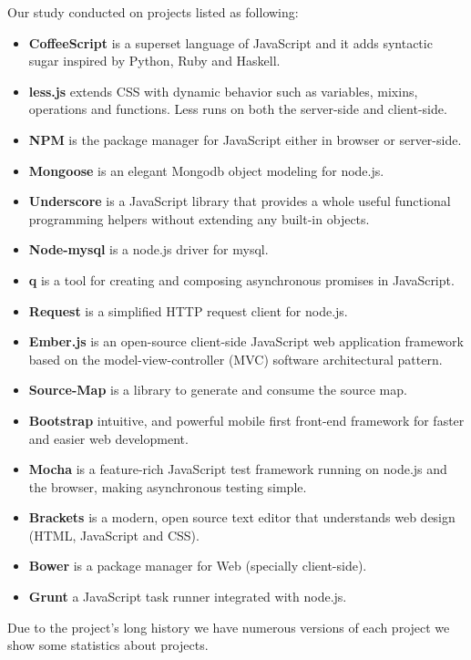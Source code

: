 Our study conducted on projects listed as following:
\begin{itemize}
	\item \textbf{CoffeeScript} is a superset language of JavaScript and it adds syntactic sugar inspired by Python, Ruby and Haskell.
	\item \textbf{less.js} extends CSS with dynamic behavior such as variables, mixins, operations and functions. Less runs on both the server-side and client-side.
	\item \textbf{NPM} is the package manager for JavaScript either in browser or server-side.
	\item \textbf {Mongoose} is an elegant Mongodb object modeling for node.js.
	\item \textbf{Underscore} is a JavaScript library that provides a whole useful functional programming helpers without extending any built-in objects.
	\item \textbf {Node-mysql} is a node.js driver for mysql.
	\item \textbf {q} is a tool for creating and composing asynchronous promises in JavaScript.
	\item \textbf {Request} is a simplified HTTP request client for node.js.
	\item \textbf{Ember.js} is an open-source client-side JavaScript web application framework based on the model-view-controller (MVC) software architectural pattern.
	\item \textbf{Source-Map} is a library to generate and consume the source map.
	\item \textbf{Bootstrap} intuitive, and powerful mobile first front-end framework for faster and easier web development.
	\item \textbf{Mocha} is a feature-rich JavaScript test framework running on node.js and the browser, making asynchronous testing simple.
	\item \textbf{Brackets} is a modern, open source text editor that understands web design (HTML, JavaScript and CSS).
	\item \textbf{Bower} is a package manager for Web (specially client-side).
	\item \textbf{Grunt} a JavaScript task runner integrated with node.js.	
\end{itemize} 
Due to the project's long history we have numerous versions of each project we show some statistics about projects.

